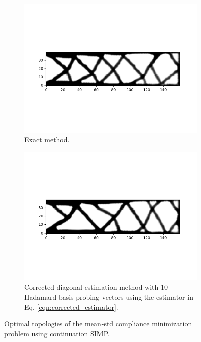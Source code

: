\begin{figure}
  \begin{subfigure}[t]{0.8\textwidth}
    \centering
    \includegraphics[width=1\textwidth]{./images/robust_approx/exact_svd_mean_std_csimp.png}
    \caption{Exact method.}
  \end{subfigure} \hfill
  \begin{subfigure}[t]{0.8\textwidth}
    \centering
    \includegraphics[width=1\textwidth]{./images/robust_approx/diagonal_mean_std_csimp.png}
    \caption{Corrected diagonal estimation method with 10 Hadamard basis probing vectors using the estimator in Eq. \ref{eqn:corrected_estimator}.}
  \end{subfigure}
  \caption{Optimal topologies of the mean-std compliance minimization problem using continuation SIMP.}
  \label{fig:mean_std}
\end{figure}

